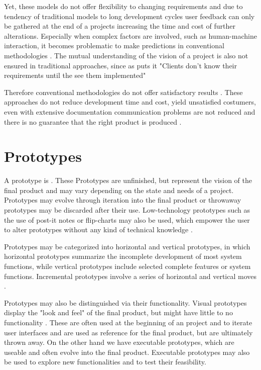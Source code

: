 \documentclass[runningheads]{llncs}
\begin{document}
Yet, these models do not offer flexibility to changing requirements and due to tendency of 
traditional models to long development cycles user feedback can only be gathered at the end 
of a projects \cite{ref_health} increasing the time and cost of further 
alterations. Especially when complex factors are involved, such as human-machine interaction,
it becomes problematic to make predictions in conventional methodologies \cite{ref_RPalternativeStrategy}. 
The mutual understanding of the vision of a project is also not ensured in traditional approaches, 
since as \cite{ref_RPalternativeStrategy}
puts it "Clients don't know their requirements until the see them implemented"

Therefore conventional methodologies do not offer satisfactory results \cite{ref_RPalternativeStrategy}.
These approaches do not reduce development time and cost, yield unsatisfied costumers,
even with extensive documentation communication problems are not reduced and there is 
no guarantee that the right product is produced \cite{ref_RPalternativeStrategy}.

\section{Prototypes}
A prototype is \cite[a working model of (parts of) an information system, 
which emphasizes specific aspects of that system]{ref_prac}. These Prototypes
are unfinished, but represent the vision of the final product and may vary depending 
on the state and needs of a project. Prototypes may evolve through iteration into the final product or
throwaway prototypes may be discarded after their use. Low-technology prototypes such as the use of post-it 
notes or flip-charts may also be used, which empower the user to alter prototypes 
without any kind of technical knowledge \cite{ref_prac}. 

Prototypes may be categorized into horizontal and vertical prototypes, in which
horizontal prototypes summarize the incomplete development of most system functions,
while vertical prototypes include selected complete features or system functions.
Incremental prototypes involve a series of horizontal and vertical moves \cite{ref_prac}.

Prototypes may also be distinguished via their functionality. 
Visual prototypes display the "look and feel" of the final product, but might have little 
to no functionality \cite{ref_RPInAction}. These are often used at the beginning of an project and to iterate 
user interfaces and are used as reference for the final product, but are ultimately thrown away.
On the other hand we have executable prototypes, which are useable and often evolve into the final product.
Executable prototypes may also be used to explore new functionalities and to test their feasibility\cite{ref_RPInAction}.
\end{document}

